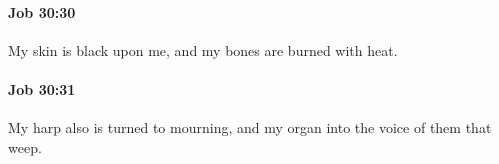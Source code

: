 		\paragraph{Job 30:30} %
			\label{JOB-30-30}

			My skin is black upon me, and my bones are burned with heat.


		\paragraph{Job 30:31} %
			\label{JOB-30-31}

			My harp also is turned to mourning, and my organ into the voice of them that weep.

